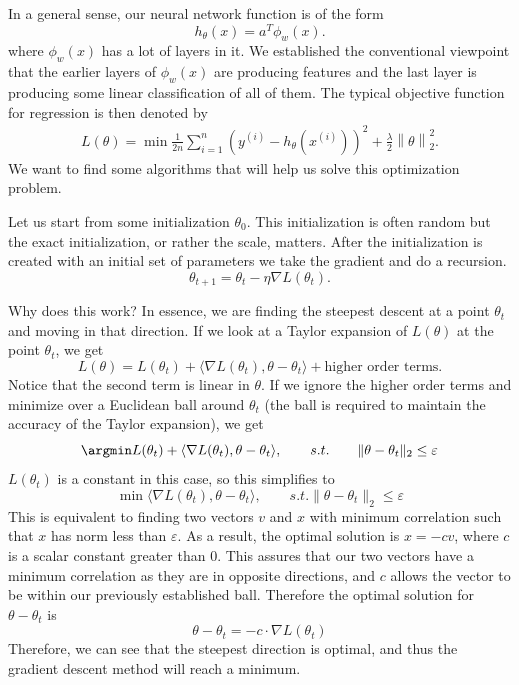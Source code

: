 

In a general sense, our neural network function is of the form
$$
h_\theta(x) = a^T \phi_w(x).
$$
where $\phi_w(x)$ has a lot of layers in it. We established the conventional viewpoint that the earlier layers of $\phi_w(x)$ are producing features and the last layer is producing some linear classification of all of them. The typical objective function for regression is then denoted by
\begin{align}
L(\theta) = \min \frac{1}{2n}\sum_{i=1}^n (y^{(i)} - h_\theta(x^{(i)}))^2 + \frac{\lambda}{2} \left\| \theta \right\|_2^2. \label{eqn:loss}
\end{align}
We want to find some algorithms that will help us solve this optimization problem.

Let us start from some initialization $\theta_0$. This initialization is often random but the exact initialization, or rather the scale, matters. After the initialization is created with an initial set of parameters we take the gradient and do a recursion.
$$
\theta_{t+1} = \theta_t - \eta \nabla L(\theta_t).
$$

Why does this work? In essence, we are finding the steepest descent at a point $\theta_t$ and moving in that direction. If we look at a Taylor expansion of $L(\theta)$ at the point $\theta_t$, we get
$$
L(\theta) = L(\theta_t) + \langle \nabla L(\theta_t), \theta - \theta_t \rangle + \text{higher order terms}.
$$
Notice that the second term is linear in $\theta$. If we ignore the higher order terms and minimize over a Euclidean ball around $\theta_t$ (the ball is required to maintain the accuracy of the Taylor expansion), we get
$$
\argmin L(\theta_t) +  \langle \nabla L(\theta_t), \theta - \theta_t \rangle, \qquad s.t. \qquad \| \theta - \theta_t \|_2 \leq \varepsilon
$$
$L(\theta_t)$ is a constant in this case, so this simplifies to
$$
\min \langle \nabla L(\theta_t), \theta - \theta_t \rangle, \qquad s.t. \| \theta - \theta_t \|_2 \leq \varepsilon
$$
This is equivalent to finding two vectors $v$ and $x$ with minimum correlation such that $x$ has norm less than $\varepsilon$. As a result, the optimal solution is  $x = -cv$, where $c$ is a scalar constant greater than 0. This assures that our two vectors have a minimum correlation as they are in opposite directions, and $c$ allows the vector to be within our previously established ball. Therefore the optimal solution for $\theta - \theta_t$ is 
$$
\theta - \theta_t = -c\cdot \nabla L(\theta_t)
$$
Therefore, we can see that the steepest direction is optimal, and thus the gradient descent method will reach a minimum.

